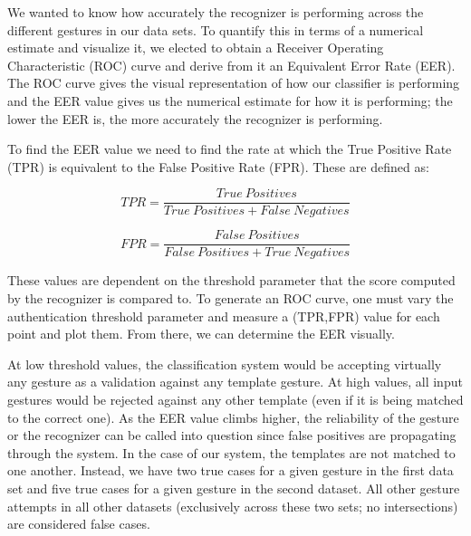 \documentclass{sig-alternate-10pt}
\begin{document}
We wanted to know how accurately the recognizer is performing across the different gestures in our data sets. To quantify this in terms of a numerical estimate and visualize it, we elected to obtain a Receiver Operating Characteristic (ROC) curve and derive from it an Equivalent Error Rate (EER). The ROC curve gives the visual representation of how our classifier is performing and the EER value gives us the numerical estimate for how it is performing; the lower the EER is, the more accurately the recognizer is performing.


To find the EER value we need to find the rate at which the True Positive Rate (TPR) is equivalent to the False Positive Rate (FPR). These are defined as:

\begin{equation}
\label{tpr}
TPR = \frac{True\:Positives}{True\:Positives + False\:Negatives}
\end{equation}

\begin{equation}
\label{fpr}
FPR = \frac{False\:Positives}{False\:Positives + True\:Negatives}
\end{equation}


These values are dependent on the threshold parameter that the score computed by the recognizer is compared to. To generate an ROC curve, one must vary the authentication threshold parameter and measure a (TPR,FPR) value for each point and plot them. From there, we can determine the EER visually. 

At low threshold values, the classification system would be accepting virtually any gesture as a validation against any template gesture. At high values, all input gestures would be rejected against any other template (even if it is being matched to the correct one). As the EER value climbs higher, the reliability of the gesture or the recognizer can be called into question since false positives are propagating through the system.  In the case of our system, the templates are not matched to one another. Instead, we have two true cases for a given gesture in the first data set and five true cases for a given gesture in the second dataset. All other gesture attempts in all other datasets (exclusively across these two sets; no intersections) are considered false cases. 
\end{document}
